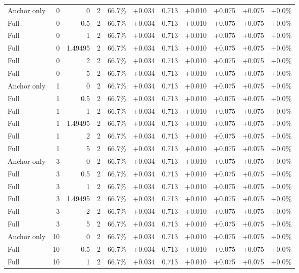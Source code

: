 \begin{table}[htbp]
\begin{tabular}{lrrrccccccc}
Anchor only & 0 & 0 & 2 & 66.7\% & +0.034 & 0.713 & +0.010 & +0.075 & +0.075 & +0.0\% \\
Full & 0 & 0.5 & 2 & 66.7\% & +0.034 & 0.713 & +0.010 & +0.075 & +0.075 & +0.0\% \\
Full & 0 & 1 & 2 & 66.7\% & +0.034 & 0.713 & +0.010 & +0.075 & +0.075 & +0.0\% \\
Full & 0 & 1.49495 & 2 & 66.7\% & +0.034 & 0.713 & +0.010 & +0.075 & +0.075 & +0.0\% \\
Full & 0 & 2 & 2 & 66.7\% & +0.034 & 0.713 & +0.010 & +0.075 & +0.075 & +0.0\% \\
Full & 0 & 5 & 2 & 66.7\% & +0.034 & 0.713 & +0.010 & +0.075 & +0.075 & +0.0\% \\
Anchor only & 1 & 0 & 2 & 66.7\% & +0.034 & 0.713 & +0.010 & +0.075 & +0.075 & +0.0\% \\
Full & 1 & 0.5 & 2 & 66.7\% & +0.034 & 0.713 & +0.010 & +0.075 & +0.075 & +0.0\% \\
Full & 1 & 1 & 2 & 66.7\% & +0.034 & 0.713 & +0.010 & +0.075 & +0.075 & +0.0\% \\
Full & 1 & 1.49495 & 2 & 66.7\% & +0.034 & 0.713 & +0.010 & +0.075 & +0.075 & +0.0\% \\
Full & 1 & 2 & 2 & 66.7\% & +0.034 & 0.713 & +0.010 & +0.075 & +0.075 & +0.0\% \\
Full & 1 & 5 & 2 & 66.7\% & +0.034 & 0.713 & +0.010 & +0.075 & +0.075 & +0.0\% \\
Anchor only & 3 & 0 & 2 & 66.7\% & +0.034 & 0.713 & +0.010 & +0.075 & +0.075 & +0.0\% \\
Full & 3 & 0.5 & 2 & 66.7\% & +0.034 & 0.713 & +0.010 & +0.075 & +0.075 & +0.0\% \\
Full & 3 & 1 & 2 & 66.7\% & +0.034 & 0.713 & +0.010 & +0.075 & +0.075 & +0.0\% \\
Full & 3 & 1.49495 & 2 & 66.7\% & +0.034 & 0.713 & +0.010 & +0.075 & +0.075 & +0.0\% \\
Full & 3 & 2 & 2 & 66.7\% & +0.034 & 0.713 & +0.010 & +0.075 & +0.075 & +0.0\% \\
Full & 3 & 5 & 2 & 66.7\% & +0.034 & 0.713 & +0.010 & +0.075 & +0.075 & +0.0\% \\
Anchor only & 10 & 0 & 2 & 66.7\% & +0.034 & 0.713 & +0.010 & +0.075 & +0.075 & +0.0\% \\
Full & 10 & 0.5 & 2 & 66.7\% & +0.034 & 0.713 & +0.010 & +0.075 & +0.075 & +0.0\% \\
Full & 10 & 1 & 2 & 66.7\% & +0.034 & 0.713 & +0.010 & +0.075 & +0.075 & +0.0\% \\

\end{tabular}
\end{table}
